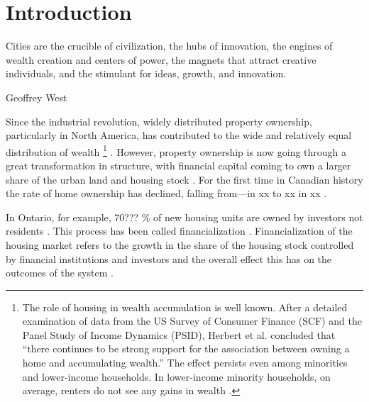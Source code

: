 \chapter{Introduction} \label{chapter-introduction}
\epigraph{Cities are the crucible of civilization, the hubs of innovation, the engines of wealth creation and centers of power, the magnets that attract creative individuals, and the stimulant for ideas, growth, and innovation.}{Geoffrey West \cite{westScaleUniversalLaws2017}}

Since the industrial revolution, widely distributed property ownership, particularly in North America, has contributed to the wide and relatively equal distribution of {wealth} \footnote{The role of housing in wealth accumulation is well known. After a detailed  examination of data from the US Survey of Consumer Finance (SCF) and the Panel Study of Income Dynamics (PSID), Herbert et al. concluded that ``there continues to be strong support for the association between owning a home and accumulating wealth.'' The effect persists even among minorities and lower-income households. In lower-income minority households, on average, renters do not see any gains in wealth \cite{herbertHomeownershipStillEffective2013}.} \cite{pikettyCapitalTwentyfirstCentury2014, harrisGrowthHomeOwnership1977, chevanGrowthHomeOwnership1989, andrewsEvolutionHomeownershipRates2011}. 
However, property ownership is now going through a great transformation in structure, with financial capital coming to own a larger share of the urban land and housing stock \cite{farhaReportFinancializationHousing2017, palleyFinancializationWhatIt2007}. For the first time in Canadian history the rate of home ownership has declined, falling from---in xx to xx in xx \cite{GET_homeownership_rates}. 

In Ontario, for example, 70??? \% of new housing units are owned by investors not residents \cite{GET77percent}. %
This process has been called financialization \cite{farhaReportFinancializationHousing2017, hansenFinanceCapitalismFinancialization2014}
\cite{tomaskovic-deveyFinancializationCausesInequality2013, palleyFinancializationWhatIt2007, seccarecciaUnderstandingFinancializationHistory2013, nemtinFinancializationHousingSocial2021}.  
Financialization of the housing market refers to the growth in the share of the housing stock controlled by financial institutions and investors and the overall effect this has on the outcomes of the system \cite{farhaReportFinancializationHousing2017, hansenFinanceCapitalismFinancialization2014}.  

